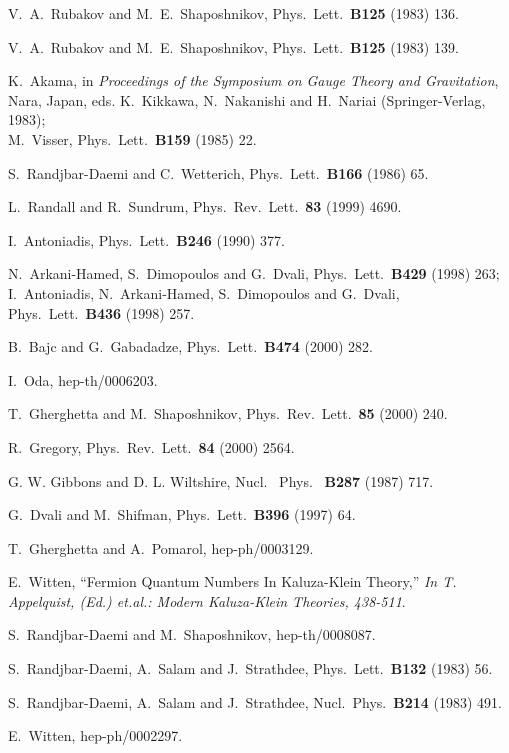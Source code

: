 \documentclass[a4paper,12pt]{article}
\begin{document}
\begin{thebibliography}{99}

V.~A.~Rubakov and M.~E.~Shaposhnikov,
Phys.\ Lett.\  {\bf B125} (1983) 136.

V.~A.~Rubakov and M.~E.~Shaposhnikov,
Phys.\ Lett.\  {\bf B125} (1983) 139.

K.~Akama, in {\it Proceedings of the Symposium on Gauge Theory and 
Gravitation}, Nara, Japan, eds. K.~Kikkawa, N.~Nakanishi and H.~Nariai 
(Springer-Verlag, 1983);\\
M.~Visser,
Phys.\ Lett.\  {\bf B159} (1985) 22.

S.~Randjbar-Daemi and C.~Wetterich,
Phys.\ Lett.\  {\bf B166} (1986) 65.

L.~Randall and R.~Sundrum,
Phys.\ Rev.\ Lett.\  {\bf 83} (1999) 4690.

I.~Antoniadis,
Phys.\ Lett.\  {\bf B246} (1990) 377.

N.~Arkani-Hamed, S.~Dimopoulos and G.~Dvali,
Phys.\ Lett.\  {\bf B429} (1998) 263;\\
I.~Antoniadis, N.~Arkani-Hamed, S.~Dimopoulos and G.~Dvali,
Phys.\ Lett.\  {\bf B436} (1998) 257.

B.~Bajc and G.~Gabadadze,
Phys.\ Lett.\  {\bf B474} (2000) 282.

I.~Oda,
hep-th/0006203.

T.~Gherghetta and M.~Shaposhnikov,
Phys.\ Rev.\ Lett.\  {\bf 85} (2000) 240.

R.~Gregory,
Phys.\ Rev.\ Lett.\  {\bf 84} (2000) 2564.

G. W. Gibbons and D. L. Wiltshire, Nucl. \ Phys. \ {\bf B287} (1987)
717.

G.~Dvali and M.~Shifman,
Phys.\ Lett.\  {\bf B396} (1997) 64.

T.~Gherghetta and A.~Pomarol,
hep-ph/0003129.

E.~Witten, ``Fermion Quantum Numbers In Kaluza-Klein Theory,''
{\it  In T. Appelquist, (Ed.) et.al.: 
Modern Kaluza-Klein Theories, 438-511}. 

S.~Randjbar-Daemi and M.~Shaposhnikov,
hep-th/0008087.

S.~Randjbar-Daemi, A.~Salam and J.~Strathdee,
Phys.\ Lett.\  {\bf B132} (1983) 56.

S.~Randjbar-Daemi, A.~Salam and J.~Strathdee,
Nucl.\ Phys.\  {\bf B214} (1983) 491.

E.~Witten,
hep-ph/0002297.

\end{thebibliography}
\end{document}
